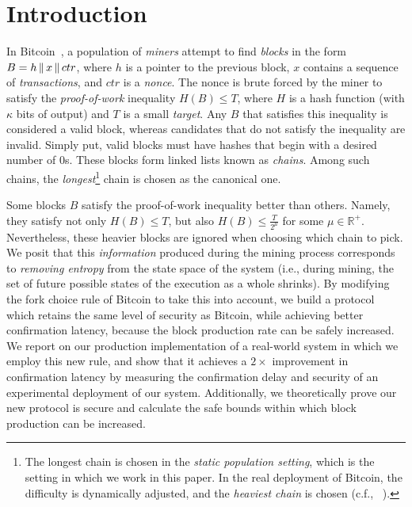 \section{Introduction}

In Bitcoin~\cite{bitcoin}, a population of \emph{miners}
attempt to find \emph{blocks} in the form $B = h \,\|\, x \,\|\, ctr$,
where $h$ is a pointer to the previous block, $x$ contains a sequence of
\emph{transactions}, and $ctr$ is a \emph{nonce}. The nonce is brute forced
by the miner to satisfy the \emph{proof-of-work} inequality $H(B) \leq T$, where
$H$ is a hash function (with $\kappa$ bits of output)
and $T$ is a small \emph{target}. Any $B$ that satisfies this
inequality is considered a valid block, whereas candidates that do not satisfy
the inequality are invalid. Simply put, valid blocks must have
hashes that begin with a desired number of $0$s.
These blocks form linked lists known as \emph{chains}.
Among such chains, the \emph{longest}\footnote{The
longest chain is chosen in the \emph{static population setting}, which is the
setting in which we work in this paper. In the real deployment of Bitcoin, the
difficulty is dynamically adjusted, and the \emph{heaviest chain} is chosen (c.f.,
~\cite{varbackbone}).} chain is chosen as the canonical one.

Some blocks $B$ satisfy the proof-of-work inequality better than others.
Namely, they satisfy not only $H(B) \leq T$, but also $H(B) \leq \frac{T}{2^\mu}$
for some $\mu \in \mathbb{R}^+$. Nevertheless, these heavier blocks are ignored when choosing
which chain to pick. We posit that this \emph{information}
produced during the mining process corresponds to \emph{removing entropy} from the
state space of the system (i.e., during mining, the set of future possible states
of the execution as a whole shrinks).
By modifying the fork choice rule of Bitcoin to take this into account,
we build a protocol which retains the same level of security as Bitcoin, while achieving
better confirmation latency, because the block production rate can be safely increased.
We report on our production implementation of a real-world system
in which we employ this new rule, and show that it achieves a $2\times$ 
improvement in confirmation latency by measuring the confirmation delay and security
of an experimental deployment of our system.
Additionally, we theoretically prove our new protocol is secure and calculate the safe
bounds within which block production can be increased.

